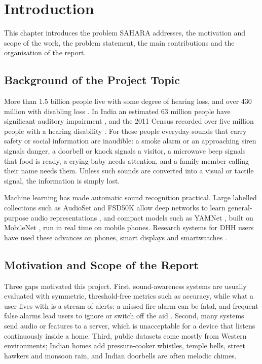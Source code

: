 \documentclass[12pt,a4paper,oneside]{report}
\begin{document}
\chapter{Introduction}
This chapter introduces the problem SAHARA addresses, the motivation and scope of the work, the problem statement, the main contributions and the organisation of the report.

\section{Background of the Project Topic}
More than 1.5 billion people live with some degree of hearing loss, and over 430 million with disabling loss \cite{who2021}. In India an estimated 63 million people have significant auditory impairment \cite{nppcd}, and the 2011 Census recorded over five million people with a hearing disability \cite{census2011}. For these people everyday sounds that carry safety or social information are inaudible: a smoke alarm or an approaching siren signals danger, a doorbell or knock signals a visitor, a microwave beep signals that food is ready, a crying baby needs attention, and a family member calling their name needs them. Unless such sounds are converted into a visual or tactile signal, the information is simply lost.

Machine learning has made automatic sound recognition practical. Large labelled collections such as AudioSet \cite{gemmeke2017} and FSD50K \cite{fonseca2022} allow deep networks to learn general-purpose audio representations \cite{hershey2017,kong2020}, and compact models such as YAMNet \cite{yamnet}, built on MobileNet \cite{howard2017}, run in real time on mobile phones. Research systems for DHH users have used these advances on phones, smart displays and smartwatches \cite{bragg2016,jain2020homesound,jain2020soundwatch,jain2022protosound}.

\section{Motivation and Scope of the Report}
Three gaps motivated this project. First, sound-awareness systems are usually evaluated with symmetric, threshold-free metrics such as accuracy, while what a user lives with is a stream of alerts: a missed fire alarm can be fatal, and frequent false alarms lead users to ignore or switch off the aid \cite{jain2020homesound,huang2023}. Second, many systems send audio or features to a server, which is unacceptable for a device that listens continuously inside a home. Third, public datasets come mostly from Western environments; Indian homes add pressure-cooker whistles, temple bells, street hawkers and monsoon rain, and Indian doorbells are often melodic chimes.
\end{document}
